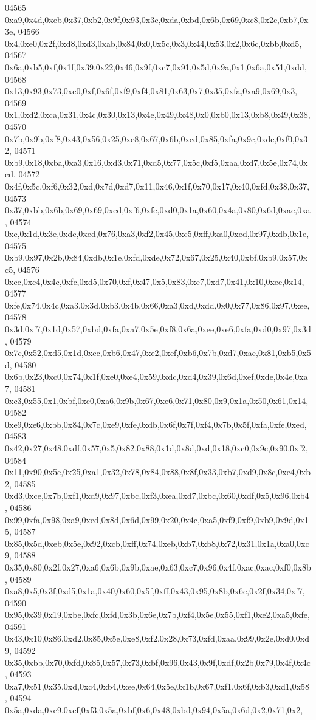 \begin{DoxyCode}
04565   0xa9,0x4d,0xeb,0x37,0xb2,0x9f,0x93,0x3c,0xda,0xbd,0x6b,0x69,0xc8,0x2c,0xb7,0x3e,
04566   0x4,0xe0,0x2f,0xd8,0xd3,0xab,0x84,0x0,0x5c,0x3,0x44,0x53,0x2,0x6c,0xbb,0xd5,
04567   0x6a,0xb5,0xf,0x1f,0x39,0x22,0x46,0x9f,0xc7,0x91,0x5d,0x9a,0x1,0x6a,0x51,0xdd,
04568   0x13,0x93,0x73,0xe0,0xf,0x6f,0xf9,0xf4,0x81,0x63,0x7,0x35,0xfa,0xa9,0x69,0x3,
04569   0x1,0xd2,0xca,0x31,0x4c,0x30,0x13,0x4e,0x49,0x48,0x0,0xb0,0x13,0xb8,0x49,0x38,
04570   0x7b,0x9b,0xf8,0x43,0x56,0x25,0xe8,0x67,0x6b,0xcd,0x85,0xfa,0x9c,0xde,0xf0,0x32,
04571   0xb9,0x18,0xba,0xa3,0x16,0xd3,0x71,0xd5,0x77,0x5c,0xf5,0xaa,0xd7,0x5e,0x74,0xcd,
04572   0x4f,0x5c,0xf6,0x32,0xd,0x7d,0xd7,0x11,0x46,0x1f,0x70,0x17,0x40,0xfd,0x38,0x37,
04573   0x37,0xbb,0x6b,0x69,0x69,0xed,0xf6,0xfe,0xd0,0x1a,0x60,0x4a,0x80,0x6d,0xac,0xa,
04574   0xe,0x1d,0x3e,0xdc,0xed,0x76,0xa3,0xf2,0x45,0xc5,0xff,0xa0,0xed,0x97,0xdb,0x1e,
04575   0xb9,0x97,0x2b,0x84,0xdb,0x1e,0xfd,0xde,0x72,0x67,0x25,0x40,0xbf,0xb9,0x57,0xc5,
04576   0xec,0xc4,0x4c,0xfc,0xd5,0x70,0xf,0x47,0x5,0x83,0xe7,0xd7,0x41,0x10,0xee,0x14,
04577   0xfe,0x74,0x4c,0xa3,0x3d,0xb3,0x4b,0x66,0xa3,0xd,0xdd,0x0,0x77,0x86,0x97,0xee,
04578   0x3d,0xf7,0x1d,0x57,0xbd,0xfa,0xa7,0x5e,0xf8,0x6a,0xee,0xe6,0xfa,0xd0,0x97,0x3d,
04579   0x7c,0x52,0xd5,0x1d,0xcc,0xb6,0x47,0xe2,0xef,0xb6,0x7b,0xd7,0xae,0x81,0xb5,0x5d,
04580   0x6b,0x23,0xc0,0x74,0x1f,0xe0,0xe4,0x59,0xdc,0xd4,0x39,0x6d,0xef,0xde,0x4e,0xa7,
04581   0xc3,0x55,0x1,0xbf,0xc0,0xa6,0x9b,0x67,0xe6,0x71,0x80,0x9,0x1a,0x50,0x61,0x14,
04582   0xe9,0xe6,0xbb,0x84,0x7c,0xe9,0xfe,0xdb,0x6f,0x7f,0xf4,0x7b,0x5f,0xfa,0xfe,0xed,
04583   0x42,0x27,0x48,0xdf,0x57,0x5,0x82,0x88,0x1d,0x8d,0xd,0x18,0xc0,0x9c,0x90,0xf2,
04584   0x11,0x90,0x5e,0x25,0xa1,0x32,0x78,0x84,0x88,0x8f,0x33,0xb7,0xd9,0x8c,0xe4,0xb2,
04585   0xd3,0xce,0x7b,0xf1,0xd9,0x97,0xbc,0xf3,0xea,0xd7,0xbc,0x60,0xdf,0x5,0x96,0xb4,
04586   0x99,0xfa,0x98,0xa9,0xed,0x8d,0x6d,0x99,0x20,0x4c,0xa5,0xf9,0xf9,0xb9,0x9d,0x15,
04587   0x85,0x5d,0xeb,0x5e,0x92,0xcb,0xff,0x74,0xeb,0xb7,0xb8,0x72,0x31,0x1a,0xa0,0xc9,
04588   0x35,0x80,0x2f,0x27,0xa6,0x6b,0x9b,0xae,0x63,0xc7,0x96,0x4f,0xac,0xac,0xf0,0x8b,
04589   0xa8,0x5,0x3f,0xd5,0x1a,0x40,0x60,0x5f,0xff,0x43,0x95,0x8b,0x6c,0x2f,0x34,0xf7,
04590   0x95,0x39,0x19,0xbe,0xfc,0xfd,0x3b,0x6e,0x7b,0xf4,0x5e,0x55,0xf1,0xe2,0xa5,0xfe,
04591   0x43,0x10,0x86,0xd2,0x85,0x5e,0xe8,0xf2,0x28,0x73,0xfd,0xaa,0x99,0x2e,0xd0,0xd9,
04592   0x35,0xbb,0x70,0xfd,0x85,0x57,0x73,0xbf,0x96,0x43,0x9f,0xdf,0x2b,0x79,0x4f,0x4c,
04593   0xa7,0x51,0x35,0xd,0xc4,0xb4,0xee,0x64,0x5e,0x1b,0x67,0xf1,0x6f,0xb3,0xd1,0x58,
04594   0x5a,0xda,0xe9,0xcf,0xf3,0x5a,0xbf,0x6,0x48,0xbd,0x94,0x5a,0x6d,0x2,0x71,0x2,

\end{DoxyCode}
